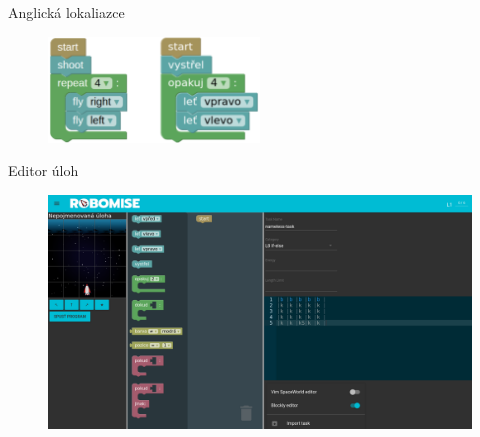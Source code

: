 \documentclass[
]{beamer}
\begin{document}
\begin{frame}{Anglická lokaliazce}
\begin{figure}
\includegraphics[width=0.5\textwidth,height=.75\textheight,keepaspectratio]{../img/roboblocks-english-czech}
\end{figure}
\end{frame}

\begin{frame}{Editor úloh}
\begin{figure}
\includegraphics[width=\textwidth,height=.75\textheight,keepaspectratio]{../img/task-editor}
\end{figure}
\end{frame}
\end{document}
